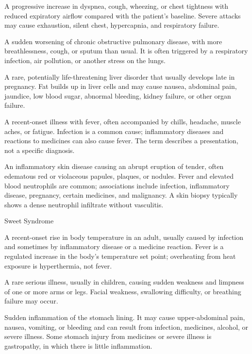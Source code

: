  A progressive increase in dyspnea, cough, wheezing, or chest tightness with reduced
expiratory airflow compared with the patient’s baseline. Severe attacks may cause
exhaustion, silent chest, hypercapnia, and respiratory failure.

 A sudden worsening of chronic obstructive pulmonary disease, with more breathlessness, cough, or sputum than usual. It is often triggered by a respiratory infection, air pollution, or another stress on the lungs.

 A rare, potentially life-threatening liver disorder that usually develops late in pregnancy. Fat builds up in liver cells and may cause nausea, abdominal pain, jaundice, low blood sugar, abnormal bleeding, kidney failure, or other organ failure.

 A recent-onset illness with fever, often accompanied by chills, headache, muscle aches, or fatigue. Infection is a common cause; inflammatory diseases and reactions to medicines can also cause fever. The term describes a presentation, not a specific diagnosis.

 An inflammatory skin disease causing an abrupt eruption of tender, often edematous red or violaceous papules, plaques, or nodules. Fever and elevated blood neutrophils are common; associations include infection, inflammatory disease, pregnancy, certain medicines, and malignancy. A skin biopsy typically shows a dense neutrophil infiltrate without vasculitis.

\synonyms
Sweet Syndrome

 A recent-onset rise in body temperature in an adult, usually caused by infection and sometimes by inflammatory disease or a medicine reaction. Fever is a regulated increase in the body's temperature set point; overheating from heat exposure is hyperthermia, not fever.

 A rare serious illness, usually in children, causing sudden weakness and limpness of one or more arms or legs. Facial weakness, swallowing difficulty, or breathing failure may occur.

 Sudden inflammation of the stomach lining. It may cause upper-abdominal pain, nausea, vomiting, or bleeding and can result from infection, medicines, alcohol, or severe illness. Some stomach injury from medicines or severe illness is gastropathy, in which there is little inflammation.

